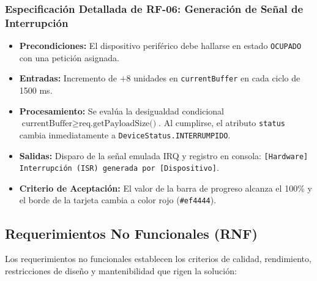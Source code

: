 \documentclass[11pt,letterpaper]{article}
\begin{document}
\subsubsection{Especificación Detallada de RF-06: Generación de Señal de Interrupción}
\begin{itemize}
    \item \textbf{Precondiciones:} El dispositivo periférico debe hallarse en estado \texttt{OCUPADO} con una petición asignada.
    \item \textbf{Entradas:} Incremento de $+8$ unidades en \texttt{currentBuffer} en cada ciclo de 1500 ms.
    \item \textbf{Procesamiento:} Se evalúa la desigualdad condicional $\text{currentBuffer} \ge \text{req.getPayloadSize()}$. Al cumplirse, el atributo \texttt{status} cambia inmediatamente a \texttt{DeviceStatus.INTERRUMPIDO}.
    \item \textbf{Salidas:} Disparo de la señal emulada IRQ y registro en consola: \texttt{[Hardware] Interrupción (ISR) generada por [Dispositivo]}.
    \item \textbf{Criterio de Aceptación:} El valor de la barra de progreso alcanza el 100\% y el borde de la tarjeta cambia a color rojo (\texttt{\#ef4444}).
\end{itemize}

\subsection{Requerimientos No Funcionales (RNF)}

Los requerimientos no funcionales establecen los criterios de calidad, rendimiento, restricciones de diseño y mantenibilidad que rigen la solución:
\end{document}
